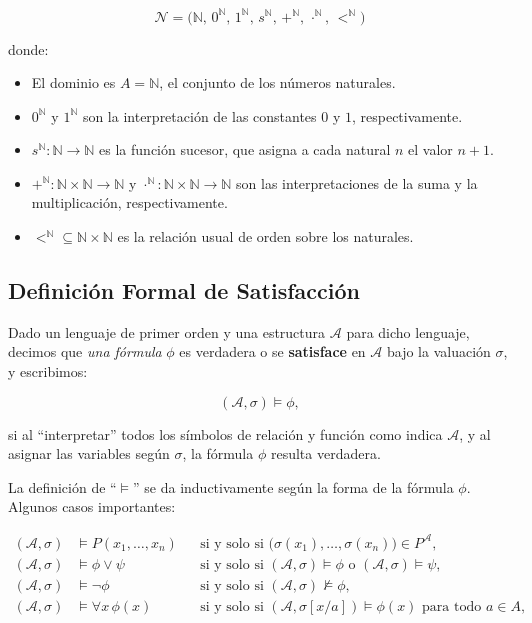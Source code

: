 \[
    \mathcal{N} = \bigl(\mathbb{N}, \,0^{\mathbb{N}}, \,1^{\mathbb{N}}, \,s^{\mathbb{N}}, \,+^{\mathbb{N}}, \,\cdot^{\mathbb{N}}, \,<^{\mathbb{N}}\bigr)
\]

donde:
\begin{itemize}
    \item El dominio es $A = \mathbb{N}$, el conjunto de los números naturales.
    \item $0^{\mathbb{N}}$ y $1^{\mathbb{N}}$ son la interpretación de las constantes $0$ y $1$, respectivamente.
    \item $s^{\mathbb{N}} : \mathbb{N} \to \mathbb{N}$ es la función sucesor, que asigna a cada natural $n$ el valor $n+1$.
    \item $+^{\mathbb{N}} : \mathbb{N} \times \mathbb{N} \to \mathbb{N}$ y $\cdot^{\mathbb{N}} : \mathbb{N} \times \mathbb{N} \to \mathbb{N}$ son las interpretaciones de la suma y la multiplicación, respectivamente.
    \item $<^{\mathbb{N}} \subseteq \mathbb{N} \times \mathbb{N}$ es la relación usual de orden sobre los naturales.
\end{itemize}

\subsection{Definición Formal de Satisfacción}

Dado un lenguaje de primer orden y una estructura $\mathcal{A}$ para dicho lenguaje, decimos que \emph{una fórmula} $\phi$ es verdadera o se \textbf{satisface} en $\mathcal{A}$ bajo la valuación $\sigma$, y escribimos:

\[
    (\mathcal{A}, \sigma) \models \phi,
\]

si al “interpretar” todos los símbolos de relación y función como indica $\mathcal{A}$, y al asignar las variables según $\sigma$, la fórmula $\phi$ resulta verdadera. 

La definición de “$\models$” se da inductivamente según la forma de la fórmula $\phi$. Algunos casos importantes:

\begin{align*}
    (\mathcal{A}, \sigma) &\models P(x_1,\dots,x_n) 
    && \text{si y solo si } \bigl(\sigma(x_1),\dots,\sigma(x_n)\bigr) \in P^{\mathcal{A}}, \\
    (\mathcal{A}, \sigma) &\models \phi \lor \psi 
    && \text{si y solo si } (\mathcal{A},\sigma) \models \phi \text{ o } (\mathcal{A},\sigma) \models \psi, \\
    (\mathcal{A}, \sigma) &\models \neg \phi 
    && \text{si y solo si } (\mathcal{A},\sigma) \not\models \phi, \\
    (\mathcal{A}, \sigma) &\models \forall x\, \phi(x) 
    && \text{si y solo si } (\mathcal{A}, \sigma[x/a]) \models \phi(x) \text{ para todo } a \in A,
\end{align*}

